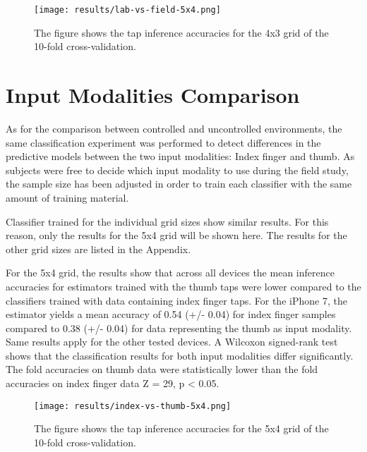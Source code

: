 \begin{figure}[h!]
  \centering
  \texttt{[image: results/lab-vs-field-5x4.png]}
  \caption{The figure shows the tap inference accuracies for the 4x3 grid of the 10-fold cross-validation.} \label{fig:participation}
\end{figure}

\section{Input Modalities Comparison}
As for the comparison between controlled and uncontrolled environments, the same classification experiment was performed to detect differences in the predictive models between the two input modalities: Index finger and thumb. As subjects were free to decide which input modality to use during the field study, the sample size has been adjusted in order to train each classifier with the same amount of training material.

Classifier trained for the individual grid sizes show similar results. For this reason, only the results for the 5x4 grid will be shown here. The results for the other grid sizes are listed in the Appendix. %

For the 5x4 grid, the results show that across all devices the mean inference accuracies for estimators trained with the thumb taps were lower compared to the classifiers trained with data containing index finger taps. For the iPhone 7, the estimator yields a mean accuracy of 0.54 (+/- 0.04) for index finger samples compared to 0.38 (+/- 0.04)  for data representing the thumb as input modality.  Same results apply for the other tested devices. A Wilcoxon signed-rank test shows that the classification results for both input modalities differ significantly. The fold accuracies on thumb data were statistically lower than the fold accuracies on index finger data Z = 29, p < 0.05.


\begin{figure}[h!]
  \centering
  \texttt{[image: results/index-vs-thumb-5x4.png]}
  \caption{The figure shows the tap inference accuracies for the 5x4 grid of the 10-fold cross-validation.} \label{fig:participation}
\end{figure}


